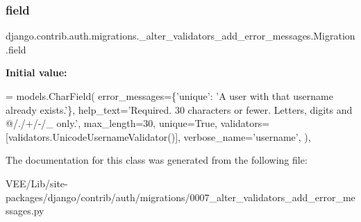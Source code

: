 \subsubsection{\texorpdfstring{field}{field}}
{\footnotesize\ttfamily django.\+contrib.\+auth.\+migrations.\+\_\+alter\+\_\+validators\+\_\+add\+\_\+error\+\_\+messages.\+Migration.\+field\hspace{0.3cm}{\ttfamily [static]}}

{\bfseries Initial value\+:}
\begin{DoxyCode}
= models.CharField(
                error\_messages=\{\textcolor{stringliteral}{'unique'}: \textcolor{stringliteral}{'A user with that username already exists.'}\},
                help\_text=\textcolor{stringliteral}{'Required. 30 characters or fewer. Letters, digits and @/./+/-/\_ only.'},
                max\_length=30,
                unique=\textcolor{keyword}{True},
                validators=[validators.UnicodeUsernameValidator()],
                verbose\_name=\textcolor{stringliteral}{'username'},
            ),
\end{DoxyCode}


The documentation for this class was generated from the following file\+:\begin{DoxyCompactItemize}
\item 
V\+E\+E/\+Lib/site-\/packages/django/contrib/auth/migrations/0007\+\_\+alter\+\_\+validators\+\_\+add\+\_\+error\+\_\+messages.\+py\end{DoxyCompactItemize}
